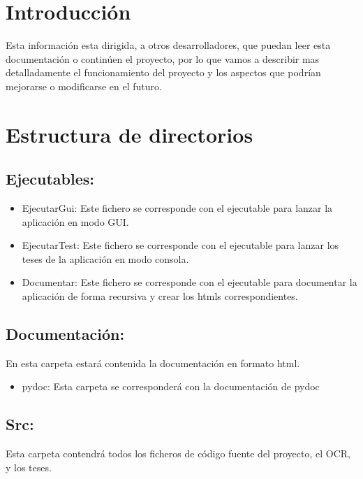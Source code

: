 
\section{Introducción}
Esta información esta dirigida, a otros desarrolladores, que puedan leer esta documentación o continúen el proyecto, por lo que vamos a describir mas detalladamente el funcionamiento del proyecto y los aspectos que podrían mejorarse o modificarse en el futuro.
\section{Estructura de directorios}

\subsection{Ejecutables:} 
	\begin{itemize}
		\item EjecutarGui: Este fichero se corresponde con el ejecutable para lanzar la aplicación en modo GUI.
		\item EjecutarTest: Este fichero se corresponde con el ejecutable para lanzar los teses de la aplicación en modo consola.
		\item Documentar: Este fichero se corresponde con el ejecutable para documentar la aplicación de forma recursiva y crear los htmls correspondientes.
	\end{itemize}
		
\subsection{Documentación:}
En esta carpeta estará contenida la documentación en formato html.
	\begin{itemize}
		\item pydoc: Esta carpeta se corresponderá con la documentación de pydoc
	\end{itemize}

\subsection{Src:}
Esta carpeta contendrá todos los ficheros de código fuente del proyecto, el OCR, y los teses.

